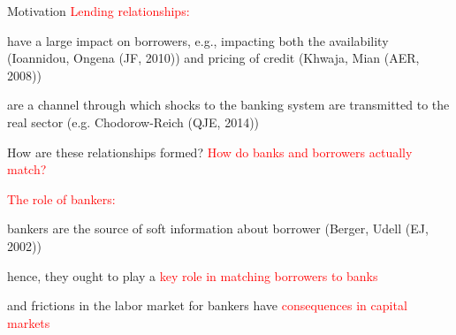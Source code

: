 \documentclass[notes,11pt, aspectratio=169]{beamer}
\newenvironment{wideitemize}{\itemize\addtolength{\itemsep}{10pt}  \setlength\itemsep{.5em}}{\enditemize}
\begin{document}
\begin{frame}{Motivation}
\textcolor{red}{Lending relationships:} 
\begin{wideitemize}
  \item have a large impact on borrowers, e.g., impacting both the availability (Ioannidou, Ongena (JF, 2010)) and pricing of credit (Khwaja,  Mian (AER, 2008))
  \item are a channel through which shocks to the banking system are transmitted to the real sector (e.g. Chodorow-Reich (QJE, 2014))
\end{wideitemize} \vspace{.3cm}

\begin{center}
How are these relationships formed? \textcolor{red}{How do banks and borrowers actually match?} \\ \vspace{.3cm}
\end{center}

\textcolor{red}{The role of bankers:} 
\begin{wideitemize}
  \item bankers are the source of soft information about borrower (Berger, Udell (EJ, 2002))
  \item hence, they ought to play a \textcolor{red}{key role in matching borrowers to banks}
  \item and frictions in the labor market for bankers have \textcolor{red}{consequences in capital markets}
\end{wideitemize} \vspace{.2cm}
\end{frame}
\end{document}
